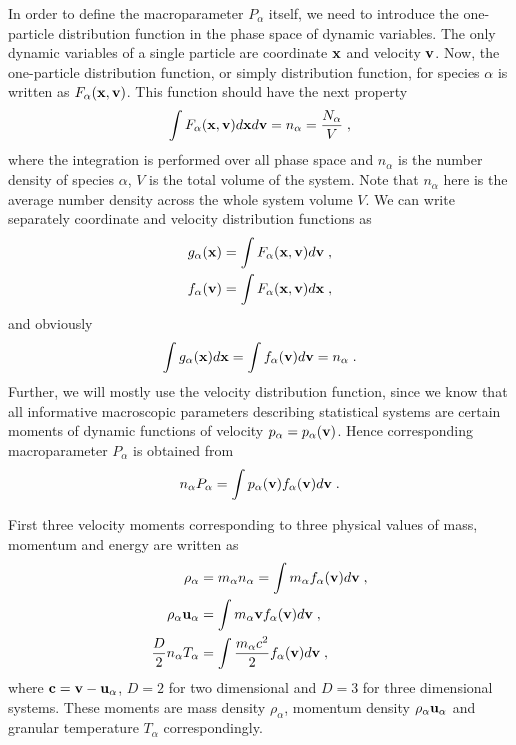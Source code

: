 \documentclass[preprint, aps, pra]{revtex4-1}
\newcommand{\bx}{{\bf{x}}}
\newcommand{\bv}{{\bf{v}}}
\newcommand{\bu}{{\bf{u}}}
\newcommand{\bc}{{\bf{c}}}
\begin{document}
In order to define the macroparameter $P_\alpha$ itself, we need to introduce the one-particle distribution function in the phase
space of dynamic variables. The only dynamic variables of a single particle are coordinate $\bx$ and velocity $\bv$.
Now, the one-particle distribution function, or simply distribution function, for species $\alpha$ is written as $F_{\alpha}(\bx,\bv)$.
This function should have the next property
\begin{equation}
  \int F_\alpha(\bx,\bv)d\bx d\bv = n_\alpha = \frac{N_\alpha}{V}\;,
\end{equation}
where the integration is performed over all phase space and $n_\alpha$ is the number density of species $\alpha$, $V$ is the total volume 
of the system. Note that $n_\alpha$ here is the average number density across the whole system volume $V$. We can write separately 
coordinate and velocity distribution functions as 
\begin{equation}
  \begin{split}
    g_\alpha(\bx) &= \int F_\alpha(\bx,\bv)d\bv\;,\\
    f_\alpha(\bv) &= \int F_\alpha(\bx,\bv)d\bx\;,
  \end{split}
\end{equation}
and obviously
\begin{equation}
  \int g_\alpha(\bx)d\bx = \int f_\alpha(\bv)d\bv = n_\alpha\;.
\end{equation}
Further, we will mostly use the velocity distribution function, since we know that all informative
macroscopic parameters describing statistical systems are certain moments of dynamic functions of velocity $p_\alpha=p_\alpha(\bv)$.
Hence corresponding macroparameter $P_\alpha$ is obtained from
\begin{equation}
  n_\alpha P_\alpha = \int p_\alpha(\bv)f_\alpha(\bv)d\bv\;.
\end{equation}

First three velocity moments corresponding to three physical values of mass, momentum and energy are written as 
\begin{equation}
  \begin{split}
    \rho_\alpha &= m_\alpha n_\alpha = \int m_\alpha f_\alpha(\bv)d\bv\;,\\
    \rho_\alpha \bu_\alpha &= \int m_\alpha\bv f_\alpha(\bv)d\bv\;,\\
    \frac{D}{2}n_\alpha T_\alpha &= \int \frac{m_\alpha c^2}{2}f_\alpha(\bv)d\bv\;,
  \end{split}
\end{equation}
where $\bc=\bv-\bu_\alpha$, $D=2$ for two dimensional and $D=3$ for three dimensional systems. These moments are mass density $\rho_\alpha$,
momentum density $\rho_\alpha\bu_\alpha$ and granular temperature $T_\alpha$ correspondingly. 
\end{document}
